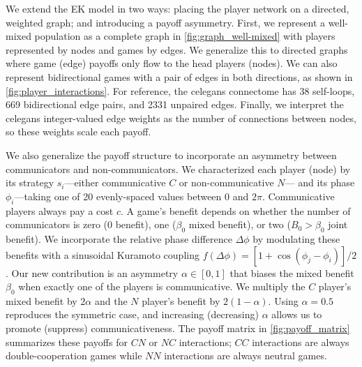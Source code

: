 \documentclass[pdflatex,lineno,referee,sn-nature]{sn-jnl}
\begin{document}
We extend the EK model in two ways:
placing the player network on a directed, weighted graph;
and introducing a payoff asymmetry.
First, we represent a well-mixed population
as a complete graph in \cref{fig:graph_well-mixed}
with players represented by nodes and games by edges.
We generalize this to directed graphs
where game (edge) payoffs only flow to the head players (nodes).
We can also represent bidirectional games with
a pair of edges in both directions,
as shown in \cref{fig:player_interactions}.
For reference, the \gls{celegans} connectome
has \num{38} self-loops, \num{669} bidirectional edge pairs,
and \num{2331} unpaired edges.
Finally, we interpret the \gls{celegans} integer-valued
edge weights as the number of connections between nodes,
so these weights scale each payoff.

We also generalize the payoff structure to incorporate
an asymmetry between communicators and non-communicators.
We characterized each player (node) by its
strategy $s_i$---either communicative $C$ or non-communicative $N$---
and its phase $\phi_i$---taking one of \num{20} evenly-spaced values
between $0$ and $2 \pi$.
Communicative players always pay a cost $c$.
A game's benefit depends on whether the number of communicators is
zero (\num{0} benefit), one ($\beta_0$ mixed benefit),
or two ($B_0 > \beta_0$ joint benefit).
We incorporate the relative phase difference $\Delta \phi$
by modulating these benefits with a sinusoidal Kuramoto coupling
$f(\Delta \phi) = [1+\cos(\phi_j - \phi_i)]/2$.
Our new contribution is an asymmetry $\alpha \in [0,1]$
that biases the mixed benefit $\beta_0$ when exactly one of the players is communicative.
We multiply the $C$ player's mixed benefit by $2\alpha$
and the $N$ player's benefit by $2(1 - \alpha)$.
Using $\alpha = 0.5$ reproduces the symmetric case,
and increasing (decreasing) $\alpha$ allows us
to promote (suppress) communicativeness.
The payoff matrix in \cref{fig:payoff_matrix} summarizes these payoffs
for $CN$ or $NC$ interactions;
$CC$ interactions are always double-cooperation games
while $NN$ interactions are always neutral games.
\end{document}
